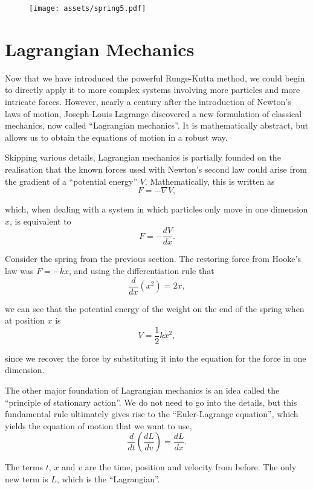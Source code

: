 \documentclass[11pt]{article}
\begin{document}
\begin{figure}[htbp]
\centering
\texttt{[image: assets/spring5.pdf]}
\label{plot:spring5}
\end{figure}
\newpage

\section{Lagrangian Mechanics}

Now that we have introduced the powerful Runge\hyp{}Kutta method, we could begin to directly apply it to more complex systems involving more particles and more intricate forces. However, nearly a century after the introduction of Newton's laws of motion, Joseph\hyp{}Louis Lagrange discovered a new formulation of classical mechanics, now called ``Lagrangian mechanics''. It is mathematically abstract, but allows us to obtain the equations of motion in a robust way.
\newline

Skipping various details, Lagrangian mechanics is partially founded on the realisation that the known forces used with Newton's second law could arise from the gradient of a ``potential energy'' $V$. Mathematically, this is written as
$$F=-\nabla V,$$

which, when dealing with a system in which particles only move in one dimension $x$, is equivalent to
$$F=-\frac{dV}{dx}.$$

Consider the spring from the previous section. The restoring force from Hooke's law was $F=-kx$, and using the differentiation rule that
$$\frac{d}{dx}\left(x^2\right)=2x,$$

we can see that the potential energy of the weight on the end of the spring when at position $x$ is
$$V=\frac{1}{2}kx^2,$$

since we recover the force by substituting it into the equation for the force in one dimension.
\newpage

The other major foundation of Lagrangian mechanics is an idea called the ``principle of stationary action''. We do not need to go into the details, but this fundamental rule ultimately gives rise to the ``Euler\hyp{}Lagrange equation'', which yields the equation of motion that we want to use,
$$\frac{d}{dt}\left(\frac{dL}{dv}\right)=\frac{dL}{dx}.$$

The terms $t$, $x$ and $v$ are the time, position and velocity from before. The only new term is $L$, which is the ``Lagrangian''.
\newline
\end{document}
